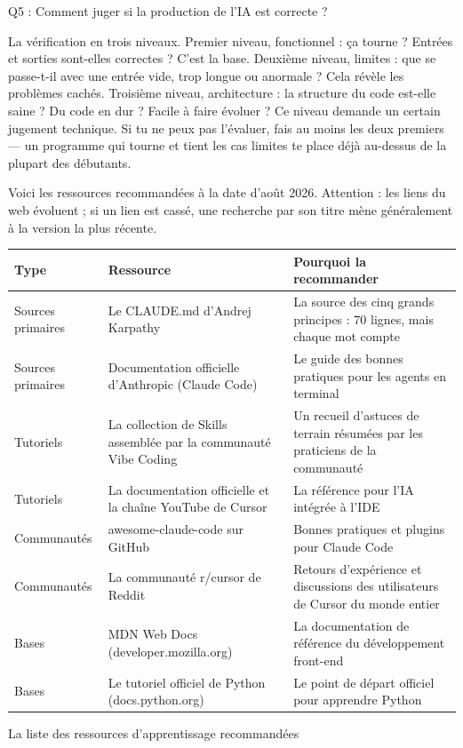 Q5 : Comment juger si la production de l'IA est correcte ?

La vérification en trois niveaux. Premier niveau, fonctionnel : ça tourne ? Entrées et sorties sont-elles correctes ? C'est la base. Deuxième niveau, limites : que se passe-t-il avec une entrée vide, trop longue ou anormale ? Cela révèle les problèmes cachés. Troisième niveau, architecture : la structure du code est-elle saine ? Du code en dur ? Facile à faire évoluer ? Ce niveau demande un certain jugement technique. Si tu ne peux pas l'évaluer, fais au moins les deux premiers — un programme qui tourne et tient les cas limites te place déjà au-dessus de la plupart des débutants.


Voici les ressources recommandées à la date d'août 2026. Attention : les liens du web évoluent ; si un lien est cassé, une recherche par son titre mène généralement à la version la plus récente.

\begin{center}
\begin{tabularx}{\linewidth}{|X|X|X|}
\hline
\textbf{Type} & \textbf{Ressource} & \textbf{Pourquoi la recommander} \tabularnewline
\hline
Sources primaires & Le CLAUDE.md d'Andrej Karpathy & La source des cinq grands principes : 70 lignes, mais chaque mot compte \tabularnewline
Sources primaires & Documentation officielle d'Anthropic (Claude Code) & Le guide des bonnes pratiques pour les agents en terminal \tabularnewline
Tutoriels & La collection de Skills assemblée par la communauté Vibe Coding & Un recueil d'astuces de terrain résumées par les praticiens de la communauté \tabularnewline
Tutoriels & La documentation officielle et la chaîne YouTube de Cursor & La référence pour l'IA intégrée à l'IDE \tabularnewline
Communautés & awesome-claude-code sur GitHub & Bonnes pratiques et plugins pour Claude Code \tabularnewline
Communautés & La communauté r/cursor de Reddit & Retours d'expérience et discussions des utilisateurs de Cursor du monde entier \tabularnewline
Bases & MDN Web Docs (developer.mozilla.org) & La documentation de référence du développement front-end \tabularnewline
Bases & Le tutoriel officiel de Python (docs.python.org) & Le point de départ officiel pour apprendre Python \tabularnewline
\hline
\end{tabularx}
\end{center}

\begin{center}\small\color{gray}La liste des ressources d'apprentissage recommandées\end{center}

